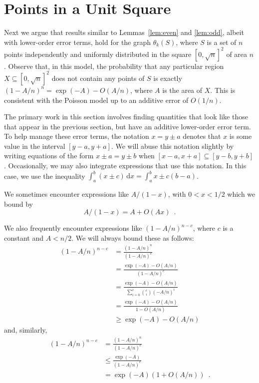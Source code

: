 \documentclass[twoside,leqno,twocolumn]{article}
\begin{document}
\section{Points in a Unit Square}

Next we argue that results similar to Lemmas~\ref{lem:even} and
\ref{lem:odd}, albeit with lower-order error terms, hold for the
graph $\theta_k(S)$, where $S$ is a set of $n$ points independently
and uniformly distributed in the square $[0,\sqrt{n}]^2$ of area $n$.
Observe that, in this model, the probability that any particular region
$X\subseteq [0,\sqrt{n}]^2$ does not contain any points of $S$ is exactly
$(1-A/n)^n=\exp(-A)-O(A/n)$, where $A$ is the area of $X$.  This is
consistent with the Poisson model up to an additive error of $O(1/n)$.

The primary work in this section involves finding quantities that look
like those that appear in the previous section, but have an additive
lower-order error term.  To help manage these error terms, the
notation $x= y\pm a$ denotes that $x$ is some value in the interval
$[y-a,y+a]$.  We will abuse this notation slightly by writing equations
of the form $x\pm a = y\pm b$ when $[x-a,x+a]\subseteq[y-b,y+b]$.
Occasionally, we may also integrate expressions that use this notation.
In this case, we use the inequality $\int_a^b (x\pm c)\,\mathrm{d}x =
\int_a^b x \pm c(b-a)$.

We sometimes encounter expressions like $A/(1-x)$, with $0<x<1/2$ which
we bound by
\[
   A/(1-x) = A+O(Ax) \enspace .
\]

We also frequently encounter expressions like $(1-A/n)^{n-c}$, where $c$
is a constant and $A < n/2$.  We will always bound these as follows:
\begin{align*}
   (1-A/n)^{n-c} 
      & = \frac{(1-A/n)^n}{(1-A/n)^c} \\
      & = \frac{\exp(-A)-O(A/n)}{(1-A/n)^c} \\
      & = \frac{\exp(-A)-O(A/n)}{\sum_{i=0}^c \binom{c}{i}(-A/n)^i} \\
      & = \frac{\exp(-A)-O(A/n)}{1-O(A/n)} \\
      & \ge \exp(-A) - O(A/n) 
\end{align*}
and, similarly, 
\begin{align*}
   (1-A/n)^{n-c} 
      & = \frac{(1-A/n)^n}{(1-A/n)^c} \\
      & \le \frac{\exp(-A)}{(1-A/n)^c} \\
      & = \exp(-A)(1+O(A/n))  \enspace .
\end{align*}
\end{document}
